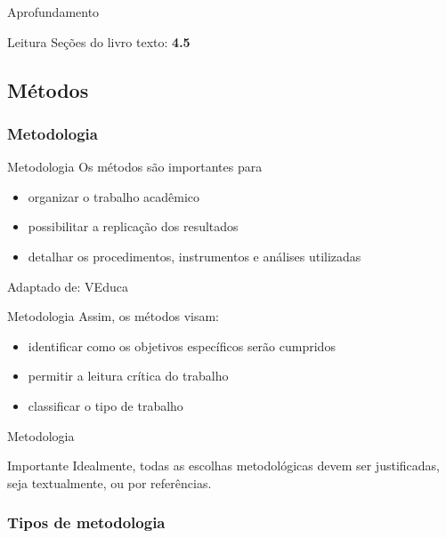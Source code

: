 \documentclass{beamer}
\begin{document}
\begin{frame}{Aprofundamento}
  \begin{block}{Leitura}
    Seções do livro texto: {\bf 4.5}
  \end{block}
\end{frame}

\subsection{Métodos}

\subsubsection{Metodologia}

\begin{frame}{Metodologia}
  \footnotesize
  Os métodos são importantes para
  \bigskip
  \begin{itemize}
    \footnotesize
  \item organizar o trabalho acadêmico
    \bigskip
  \item possibilitar a replicação dos resultados
    \bigskip
  \item detalhar os procedimentos, instrumentos e análises utilizadas
  \end{itemize}

  \vfill
  \scriptsize
  Adaptado de: VEduca
\end{frame}

\begin{frame}{Metodologia}
  \footnotesize
  Assim, os métodos visam:
  \bigskip
  \begin{itemize}
    \footnotesize
  \item identificar como os objetivos específicos serão cumpridos
    \bigskip
  \item permitir a leitura crítica do trabalho
    \bigskip
  \item classificar o tipo de trabalho
  \end{itemize}
\end{frame}

\begin{frame}{Metodologia}
  \begin{block}{Importante}
    \footnotesize
    Idealmente, todas as escolhas metodológicas devem ser
    justificadas, seja textualmente, ou por referências.
  \end{block}
\end{frame}

\subsubsection{Tipos de metodologia}
\end{document}

